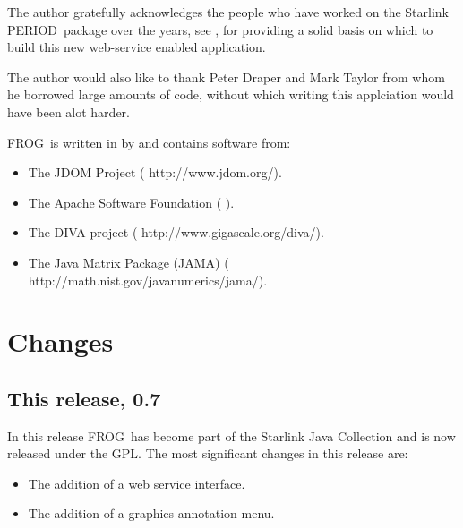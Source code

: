\documentclass[twoside,11pt,nolof]{starlink}
\providecommand{\FROG}{\textsf{FROG}}
\providecommand{\PERIOD}{\textsf{PERIOD}}
\begin{document}
The author gratefully acknowledges the people who have worked on the Starlink \PERIOD\ package over the years, see , for providing a solid basis on which to build this new web-service enabled application.

The author would also like to thank Peter Draper and Mark Taylor from whom he borrowed large amounts of code, without which writing this applciation would have been alot harder.

\FROG\ is written in
 by
 and
contains software from:
\begin{itemize}
\item The JDOM Project (
                        {http://www.jdom.org/}).
\item The Apache Software Foundation
      ( ).
\item The DIVA project
      (
                         {http://www.gigascale.org/diva/}).
\item The Java Matrix Package (JAMA)
      (
                         {http://math.nist.gov/javanumerics/jama/}).
\end{itemize}

\section{Changes}
\subsection{This release, 0.7}
In this release \FROG\ has become part of the Starlink Java Collection and is now released under the GPL. The most significant changes in this release are:
\begin{itemize}

   \item The addition of a web service interface.
   
   \item The addition of a graphics annotation menu.
    
\end{itemize}

\end{document}
